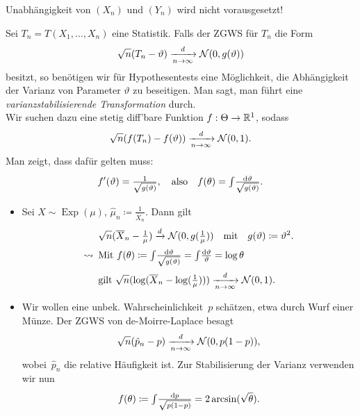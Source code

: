 \documentclass{cheat-sheet}
\newcommand{\Normal}{\mathcal{N}} %
\DeclareMathOperator{\Exp}{Exp} %
\begin{document}
\begin{bem}
  Unabhängigkeit von $(X_n)$ und $(Y_n)$ wird nicht vorausgesetzt!
\end{bem}



\begin{situation}
  Sei $T_n = T(X_1, \ldots, X_n)$ eine Statistik.
  Falls der ZGWS für $T_n$ die Form
  \[ \sqrt{n} (T_n - \vartheta) \xra[n \to \infty]{d} \Normal(0, g(\vartheta)) \]
  besitzt, so benötigen wir für Hypothesentests eine Möglichkeit, die Abhängigkeit der Varianz von Parameter $\vartheta$ zu beseitigen.
  Man sagt, man führt eine \emph{varianzstabilisierende Transformation} durch. \\
  Wir suchen dazu eine stetig diff'bare Funktion $f : \Theta \to \mathbb{R}^1$, sodass
  \[ \sqrt{n} (f(T_n) - f(\vartheta)) \xra[n \to \infty]{d} \Normal(0, 1). \]
  Man zeigt, dass dafür gelten muss:
  \[
    f'(\vartheta) = \tfrac{1}{\sqrt{g(\vartheta)}}, \quad \text{also} \quad
    f(\theta) = {\textstyle \int\limits_{}^{}} \tfrac{\mathrm{d} \vartheta}{\sqrt{g(\vartheta)}}.
  \]
\end{situation}

\begin{bspe}
  \begin{itemize}
    \item Sei $X \sim \Exp(\mu)$, $\hat{\mu}_n \coloneqq \tfrac{1}{\overline{X}_n}$.
    Dann gilt
    \begin{align*}
      & \sqrt{n} (\overline{X}_n - \tfrac{1}{\mu}) \xra{d} \Normal(0, g(\tfrac{1}{\mu}))
      \quad \text{mit} \quad
      g(\vartheta) \coloneqq \vartheta^2. \\
      \leadsto \enspace & \text{Mit } f(\theta) \coloneqq \myint{}{} \tfrac{\d \vartheta}{\sqrt{g(\vartheta)}} = \myint{}{} \tfrac{\d \vartheta}{\vartheta} = \log \theta \\
      & \text{gilt } \sqrt{n} (\log(\overline{X}_n - \log(\tfrac{1}{\mu}))) \xra[n \to \infty]{d} \Normal(0, 1).
    \end{align*}
    \item Wir wollen eine unbek. Wahrscheinlichkeit~$p$ schätzen, etwa durch Wurf einer Münze.
    Der ZGWS von de-Moirre-Laplace besagt
    \[ \sqrt{n} ( \hat{p}_n - p) \xra[n \to \infty]{d} \Normal(0, p (1-p)), \]
    wobei~$\hat{p}_n$ die relative Häufigkeit ist.
    Zur Stabilisierung der Varianz verwenden wir nun
    \[ f(\theta) \coloneqq {\textstyle \int\limits_{}^{}} \tfrac{\mathrm{d} p}{\sqrt{p (1-p)}} = 2 \arcsin(\sqrt{\theta}). \]
  \end{itemize}
\end{bspe}
\end{document}
